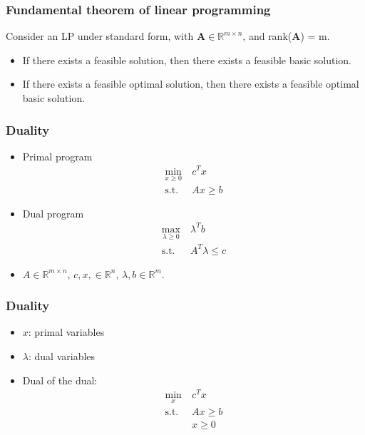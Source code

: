 \documentclass{beamer}
\def\RR{\mathcal{R}}
\def\bA{\boldsymbol{A}}
\def\RR{\mathbb{R}}
\begin{document}
\begin{frame}
	\frametitle{Fundamental theorem of linear programming}

Consider an LP under standard form, with $\bA \in \RR^{m \times n}$, and rank($\bA$) = m.
	\begin{itemize}
		\item
		If there exists a feasible solution, then there exists a feasible basic solution.
		\item
		If there exists a feasible optimal solution, then there exists a feasible optimal basic solution.
	\end{itemize}

\end{frame}
\begin{frame}
	\frametitle{Duality}

\begin{itemize}
	\item 
{\red Primal} program
\begin{align*}
	\min_{x \geq 0} \ & c^T x \\
	\mbox{s.t. } & Ax \geq b
\end{align*}
\item
{\red Dual} program
\begin{align*}
	\max_{\lambda \geq 0} \ & \lambda^T b \\
	\mbox{s.t. } & A^T \lambda \leq c
\end{align*}
\item
$A \in \RR^{m \times n}$, $c, x, \in \RR^n$, $\lambda, b \in \RR^m$.
\end{itemize}
\end{frame}

\begin{frame}
	\frametitle{Duality}

\begin{itemize}
	\item 
	$x$: primal variables
	\item
	$\lambda$: dual variables
\item 	
	Dual of the dual:
	\begin{align*}
		\min_x \ & c^T x \\
		\mbox{s.t. } & Ax \geq b \\
		& x \geq 0
	\end{align*}
\end{itemize}
	
\end{frame}
\end{document}
